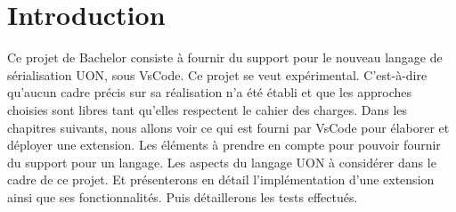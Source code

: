 \documentclass[
    iict, %
    il, %
]{heig-tb}
\begin{document}
\maketitle
\frontmatter
\clearemptydoublepage

\preamble
\let\cleardoublepage\clearpage
\authentification
\let\cleardoublepage\clearpage

\begin{abstract}
    
\end{abstract}

\listoffigures
{}
\listoflistings
{}

\tableofcontents

\printnomenclature
\clearemptydoublepage
{}

\pagestyle{fancy}
\fancyhf{}
\renewcommand\headrulewidth{1pt}

\fancyhead[L]{\itshape\nouppercase{\leftmark}}

\renewcommand{\chaptermark}[1]{\markboth{\MakeUppercase{#1}}{}}

\renewcommand\footrulewidth{1pt}


\renewcommand{\headrulewidth}{0.4pt}
\renewcommand{\footrulewidth}{0.4pt}

\titlespacing*{\chapter}{0pt}{-40pt}{20pt}


\mainmatter
\chapter{Introduction}
Ce projet de Bachelor consiste à fournir du support pour le nouveau langage de sérialisation UON, sous VsCode. Ce projet se veut expérimental. C'est-à-dire qu'aucun cadre précis sur sa réalisation n'a été établi et que les approches choisies sont libres tant qu'elles respectent le cahier des charges.
Dans les chapitres suivants, nous allons voir ce qui est fourni par VsCode pour élaborer et déployer une extension.
Les éléments à prendre en compte pour pouvoir fournir du support pour un langage.
Les aspects du langage UON à considérer dans le cadre de ce projet.
Et présenterons en détail l'implémentation d'une extension ainsi que ses fonctionnalités. Puis détaillerons les tests effectués.
\end{document}

